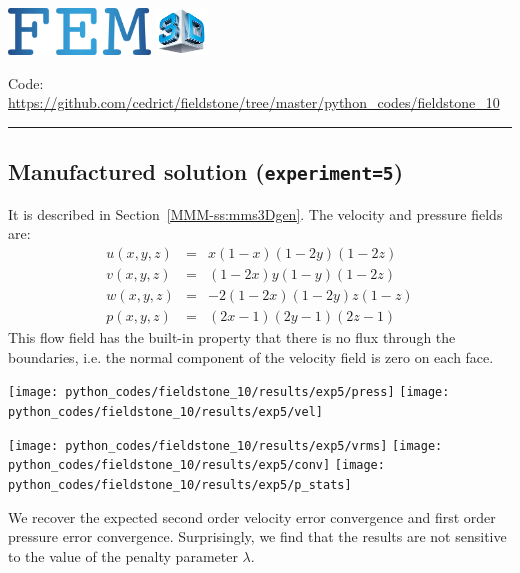 \includegraphics[height=1.25cm]{images/pictograms/FEM}
\includegraphics[height=1.25cm]{images/pictograms/3d}




\begin{center}
\inpython
\injulia
\infortran
{\small Code: \url{https://github.com/cedrict/fieldstone/tree/master/python_codes/fieldstone_10}}
\end{center}

\par\noindent\rule{\textwidth}{0.4pt}


\subsection*{Manufactured solution ({\tt experiment=5})}

It is described in Section~\ref{MMM-ss:mms3Dgen}.
The velocity and pressure fields are:
\begin{eqnarray}
u(x,y,z) &=& x(1-x)(1-2y)(1-2z)\\
v(x,y,z) &=& (1-2x) y(1-y) (1-2z) \\
w(x,y,z) &=& -2(1-2x)(1-2y)z(1-z) \\
p(x,y,z) &=& (2x-1)(2y-1)(2z-1)
\end{eqnarray}
This flow field has the built-in property that there is no flux through the 
boundaries, i.e. the normal component of the velocity field is zero on each face. 

\begin{center}
\texttt{[image: python\_codes/fieldstone\_10/results/exp5/press]}
\texttt{[image: python\_codes/fieldstone\_10/results/exp5/vel]}
\end{center}

\begin{center}
\texttt{[image: python\_codes/fieldstone\_10/results/exp5/vrms]}
\texttt{[image: python\_codes/fieldstone\_10/results/exp5/conv]}
\texttt{[image: python\_codes/fieldstone\_10/results/exp5/p\_stats]}
\end{center}
We recover the expected second order velocity error convergence 
and first order pressure error convergence. 
Surprisingly, we find that the results are not sensitive to the value of the penalty parameter $\lambda$.

